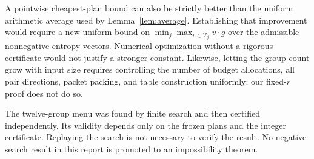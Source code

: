 A pointwise cheapest-plan bound can also be strictly better than the
uniform arithmetic average used by Lemma~\ref{lem:average}. Establishing
that improvement would require a new uniform bound on
$\min_j\max_{v\in\mathcal V_j}v\cdot g$ over the admissible nonnegative
entropy vectors. Numerical optimization without a rigorous certificate
would not justify a stronger constant. Likewise, letting the group count
grow with input size requires controlling the number of budget allocations,
all pair directions, packet packing, and table construction uniformly;
our fixed-$r$ proof does not do so.

The twelve-group menu was found by finite search and then certified
independently. Its validity depends only on the frozen plans and the
integer certificate. Replaying the search is not necessary to verify the
result. No negative search result in this report is promoted to an
impossibility theorem.
